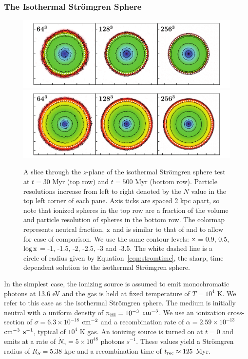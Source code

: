 \documentclass[fleq,usenatbib]{mnras}
\newcommand{\strom}{Str\"omgren}
\begin{document}
{\subsubsection{The Isothermal \strom{} Sphere}
\begin{figure}
\includegraphics[width=1\linewidth]{Figures/strom_slice_iso_030.pdf}
\includegraphics[width=1\linewidth]{Figures/strom_slice_iso_500.pdf}
\caption{A slice through the $z$-plane of the isothermal \strom{} sphere
test at $t=30$ Myr (top row) and $t=500$ Myr (bottom row). Particle 
resolutions increase from left to right denoted by the $N$ value in the top 
left corner of each pane. Axis ticks are spaced 2 kpc apart, so note that 
ionized spheres in the top row are a fraction of the volume and particle 
resolution of spheres in the bottom row. The colormap represents neutral 
fraction, $\rm x$ and is similar to that of \protect\cite{pawlikSchaye08} and 
\protect\cite{pawlikSchaye11} to allow for ease of comparison.  We use the same
contour levels: $\rm x$ = 0.9, 0.5, $\log \rm x$ = -1, -1.5, 
-2, -2.5, -3 and -3.5. The white dashed line is a circle of radius given by 
Equation~\ref{eqn:stromtime}, the sharp, time dependent solution to the 
isothermal \strom{} sphere.}
\label{fig:stromslice}
\end{figure}
In the simplest case, the ionizing source is assumed to emit monochromatic 
photons at 13.6 eV and the gas is held at fixed temperature of $T=10^4$ K.
We refer to this case as the isothermal \strom{} sphere.  The medium is 
initially neutral with a uniform density of $n_{\rm HI} = 10^{-3}$ 
$\rm cm^{-3}$. We use an ionization cross-section of $\sigma = 6.3 \times 
10^{-18}$ $\rm cm^{-2}$ and a recombination rate of $\alpha = 2.59 \times 
10^{-13}$ $\rm cm^{-3}$ $\rm s^{-1}$, typical of $10^4$ K gas. An ionizing 
source is turned on at $t=0$ and emits at a rate of $\dot{N}_\gamma = 5 
\times 10^{48}$ photons $s^{-1}$.  These values yield a \strom{} radius of 
$R_S = 5.38$ kpc and a recombination time of $t_{\rm rec} \approx  125$ Myr. 

}
\end{document}
